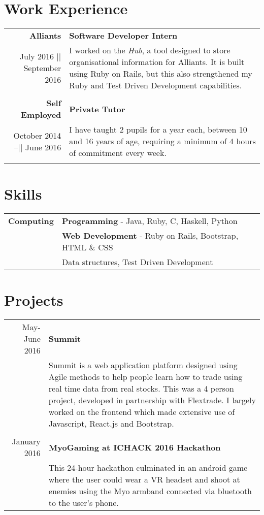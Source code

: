 \documentclass[a4paper,10pt]{article}
\begin{document}
	
	\section*{Work Experience}
		
	\begin{tabular}{ r |p{10cm}}
		
		\large{\textbf{Alliants}} & \textbf{Software Developer Intern}
		\\
		July 2016 || September 2016 & I worked on the \textit{Hub}, a tool designed to store organisational information for Alliants. It is built using Ruby on Rails, but this also strengthened my Ruby and Test Driven Development capabilities.
		\\\multicolumn{2}{c}{} \\
		
		\large{\textbf{Self Employed}} & \textbf{Private Tutor}
		 \\		
		 October 2014 –|| June 2016 & I have taught 2 pupils for a year each, between 10 and 16 years of age, requiring a minimum of 4 hours of commitment every week.
		\\\multicolumn{2}{c}{} \\

			
	\end{tabular}
	
	\section*{Skills}
	
	\begin{tabular}{r|p{12cm}}	
		\textbf{Computing}	 & \textbf{Programming} - Java, Ruby, C, Haskell, Python \\&
		\textbf{Web Development} - Ruby on Rails, Bootstrap, HTML \& CSS \\&
		Data structures, Test Driven Development
	\end{tabular}
	
	\section*{Projects}
	
	\begin{tabular}{r|p{12cm}}
		
		May-June 2016  & \textbf{Summit} \\& Summit is a web application platform designed using Agile methods to help people learn how to trade using real time data from real stocks. This was a 4 person project, developed in partnership with Flextrade. I largely worked on the frontend which made extensive use of Javascript, React.js and Bootstrap.
		\\\multicolumn{2}{c}{} \\
		
		January 2016 & \textbf{MyoGaming at ICHACK 2016 Hackathon} \\&
		This 24-hour hackathon culminated in an android game where the user could wear a VR headset and shoot at enemies using the Myo armband connected via bluetooth to the user's phone.
	\end{tabular}

	
	
	
\end{document}
